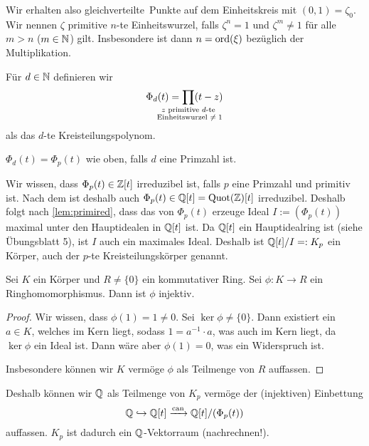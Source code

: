 \documentclass[12pt,a4paper]{scrartcl}
\begin{document}

Wir erhalten also \glqq gleichverteilte\grqq\ Punkte auf dem Einheitskreis mit $(0,1) = \zeta_0$. Wir nennen $\zeta$ primitive $n$-te Einheitswurzel, falls $\zeta^n = 1$ und $\zeta^m \neq 1$ für alle $m > n$ ($m \in \mathbb N$) gilt. Insbesondere ist dann $n = \operatorname{ord} (\xi)$ bezüglich der Multiplikation.

\begin{defi}
	Für $d \in \mathbb N$ definieren wir 
	\begin{equation*}
		\Phi_d(t) = \prod_{\mathclap{\substack{\text{$z$ primitive $d$-te}\\\text{ Einheitswurzel $\neq 1$}}}} (t - z)
	\end{equation*}
	als das $d$-te Kreisteilungspolynom.
\end{defi}

\begin{bem}
	$\Phi_d(t) = \Phi_p(t)$ wie oben, falls $d$ eine Primzahl ist. 
\end{bem}

Wir wissen, dass $\Phi_p(t) \in \mathbb Z[t]$ irreduzibel ist, falls $p$ eine Primzahl und primitiv ist. Nach dem  ist deshalb auch $\Phi_p(t) \in \mathbb Q[t] = \operatorname{Quot}(\mathbb Z)[t]$ irreduzibel. Deshalb folgt nach \cref{lem:primired}, dass das von $\Phi_p(t)$ erzeuge Ideal $I := \left( \Phi_p(t)\right) $ maximal unter den Hauptidealen in $\mathbb Q[t]$ ist. Da $\mathbb Q[t]$ ein Hauptidealring ist (siehe Übungsblatt 5), ist $I$ auch ein maximales Ideal. Deshalb ist $\mathbb Q[t] / I =: K_p $ ein Körper, auch der $p$-te Kreisteilungskörper genannt.

\begin{lem} \label{lem:koerhomoinj}
	Sei $K$ ein Körper und $R \neq \{0\}$ ein kommutativer Ring. Sei $\phi: K \to R$ ein Ringhomomorphismus. Dann ist $\phi$ injektiv.
\end{lem}

\begin{proof}
	Wir wissen, dass $\phi (1) = 1 \neq 0$. Sei $\ker \phi \neq \{0\}$. Dann existiert ein $a \in K$, welches im Kern liegt, sodass $1 = a^{-1}\cdot a$, was auch im Kern liegt, da $\ker \phi$ ein Ideal ist. Dann wäre aber $\phi(1) = 0$, was ein Widerspruch ist.
	
	Insbesondere können wir $K$ vermöge $\phi$ als Teilmenge von $R$ auffassen.  
\end{proof}

Deshalb können wir $\mathbb Q$ als Teilmenge von $K_p$ vermöge der (injektiven) Einbettung \[\mathbb Q \hookrightarrow \mathbb Q[t] \xrightarrow{\operatorname{can}} \mathbb Q[t]/(\Phi_p(t))\] auffassen. $K_p$ ist dadurch ein $\mathbb Q$-Vektorraum (nachrechnen!).
\end{document}
